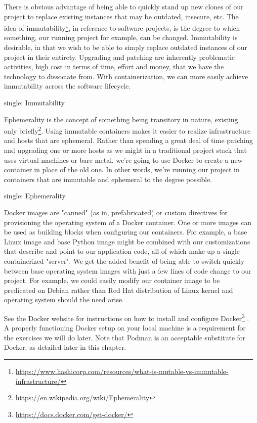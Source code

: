 \justify
There is obvious advantage of being able to quickly stand up new clones
of our project to replace existing instances that may be outdated,
insecure, etc. The idea of immutability\footnote{\url{https://www.hashicorp.com/resources/what-is-mutable-vs-immutable-infrastructure/}},
in reference to software projects, is the degree to which something, our
running project for example, can be changed. Immutability is desirable,
in that we wish to be able to simply replace outdated instances of our
project in their entirety. Upgrading and patching are inherently
problematic activities, high cost in terms of time, effort and money,
that we have the technology to dissociate from. With containerization,
we can more easily achieve immutability across the software lifecycle.

single: Immutability

\justify
Ephemerality is the concept of something being transitory in nature,
existing only briefly\footnote{\url{https://en.wikipedia.org/wiki/Ephemerality}}.
Using immutable containers makes it easier to realize infrastructure and
hosts that are ephemeral. Rather than spending a great deal of time
patching and upgrading one or more hosts as we might in a traditional
project stack that uses virtual machines or bare metal, we're going to
use Docker to create a new container in place of the old one. In other
words, we're running our project in containers that are immutable and
ephemeral to the degree possible.

single: Ephemerality

\justify
Docker images are "canned" (as in, prefabricated) or custom directives
for provisioning the operating system of a Docker container. One or more
images can be used as building blocks when configuring our containers.
For example, a base Linux image and base Python image might be combined
with our customizations that describe and point to our application code,
all of which make up a single containerized "server". We get the added
benefit of being able to switch quickly between base operating system
images with just a few lines of code change to our project. For example,
we could easily modify our container image to be predicated on Debian
rather than Red Hat distribution of Linux kernel and operating system
should the need arise.

\justify
See the Docker website for instructions on how to install and configure
Docker\footnote{\url{https://docs.docker.com/get-docker/}} . A properly
functioning Docker setup on your local machine is a requirement for the
exercises we will do later. Note that Podman is an acceptable substitute
for Docker, as detailed later in this chapter.

